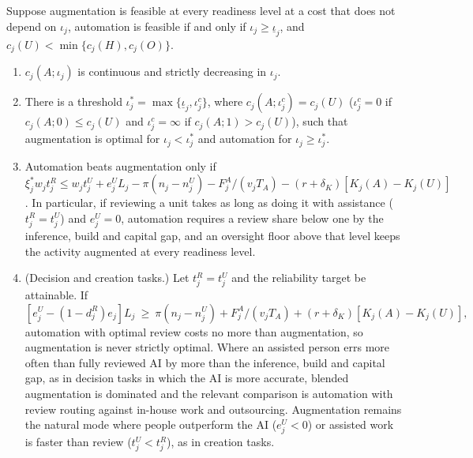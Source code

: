 \begin{proposition}\label{prop:tasks-augment}
Suppose augmentation is feasible at every readiness level at a cost that does not depend on $\iota_j$, automation is feasible if and only if $\iota_j\ge\underline\iota_j$, and $c_j(U)<\min\{c_j(H),c_j(O)\}$.
\begin{enumerate}
\item[(a)] $c_j(A;\iota_j)$ is continuous and strictly decreasing in $\iota_j$.
\item[(b)] There is a threshold $\iota^*_j=\max\{\underline\iota_j,\iota^c_j\}$, where $c_j(A;\iota^c_j)=c_j(U)$ ($\iota^c_j=0$ if $c_j(A;0)\le c_j(U)$ and $\iota^c_j=\infty$ if $c_j(A;1)>c_j(U)$), such that augmentation is optimal for $\iota_j<\iota^*_j$ and automation for $\iota_j\ge\iota^*_j$.
\item[(c)] Automation beats augmentation only if $\xi^*_jw_jt^R_j\le w_jt^U_j+e^U_jL_j-\pi(n_j-n^U_j)-F^A_j/(v_jT_A)-(r+\delta_K)[K_j(A)-K_j(U)]$. In particular, if reviewing a unit takes as long as doing it with assistance ($t^R_j=t^U_j$) and $e^U_j=0$, automation requires a review share below one by the inference, build and capital gap, and an oversight floor above that level keeps the activity augmented at every readiness level.
\item[(d)] (Decision and creation tasks.) Let $t^R_j=t^U_j$ and the reliability target be attainable. If
\[
[e^U_j-(1-d^R_j)e_j]L_j\ \ge\ \pi(n_j-n^U_j)+F^A_j/(v_jT_A)+(r+\delta_K)[K_j(A)-K_j(U)],
\]
automation with optimal review costs no more than augmentation, so augmentation is never strictly optimal. Where an assisted person errs more often than fully reviewed AI by more than the inference, build and capital gap, as in decision tasks in which the AI is more accurate, blended augmentation is dominated and the relevant comparison is automation with review routing against in-house work and outsourcing. Augmentation remains the natural mode where people outperform the AI ($e^U_j<0$) or assisted work is faster than review ($t^U_j<t^R_j$), as in creation tasks.
\end{enumerate}
\end{proposition}

